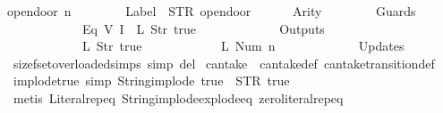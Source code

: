 \begin{isabellebody}
{\isachardoublequoteopen}opendoor\ n\ {\isasymequiv}\ {\isasymlparr}\isanewline
\ \ \ \ \ \ Label\ {\isacharequal}\ STR\ {\isacharprime}{\isacharprime}opendoor{\isacharprime}{\isacharprime}{\isacharcomma}\isanewline
\ \ \ \ \ \ Arity\ {\isacharequal}\ {}{\isacharcomma}\isanewline
\ \ \ \ \ \ Guards\ {\isacharequal}\ {\isacharbrackleft}\isanewline
\ \ \ \ \ \ \ \ \ \ \ \ {\isacharparenleft}Eq\ {\isacharparenleft}V\ {\isacharparenleft}I\ {}{\isacharparenright}{\isacharparenright}\ {\isacharparenleft}L\ {\isacharparenleft}Str\ {\isacharprime}{\isacharprime}true{\isacharprime}{\isacharprime}{\isacharparenright}{\isacharparenright}{\isacharparenright}\isanewline
\ \ \ \ \ \ {\isacharbrackright}{\isacharcomma}\isanewline
\ \ \ \ \ \ Outputs\ {\isacharequal}\ {\isacharbrackleft}\isanewline
\ \ \ \ \ \ \ \ \ \ \ \ {\isacharparenleft}L\ {\isacharparenleft}Str\ {\isacharprime}{\isacharprime}true{\isacharprime}{\isacharprime}{\isacharparenright}{\isacharparenright}{\isacharcomma}\isanewline
\ \ \ \ \ \ \ \ \ \ \ \ {\isacharparenleft}L\ {\isacharparenleft}Num\ n{\isacharparenright}{\isacharparenright}\isanewline
\ \ \ \ \ \ {\isacharbrackright}{\isacharcomma}\isanewline
\ \ \ \ \ \ Updates\ {\isacharequal}\ {\isacharbrackleft}{\isacharbrackright}\isanewline
{\isasymrparr}{\isachardoublequoteclose}\isanewline
\isanewline
{}\isamarkupfalse%
\ size{\isacharunderscore}fset{\isacharunderscore}overloaded{\isacharunderscore}simps\ {\isacharbrackleft}simp\ del{\isacharbrackright}\isanewline
\isanewline
{}\isamarkupfalse%
\ can{\isacharunderscore}take\ {\isacharequal}\ can{\isacharunderscore}take{\isacharunderscore}def\ can{\isacharunderscore}take{\isacharunderscore}transition{\isacharunderscore}def\isanewline
\isanewline
{}\isamarkupfalse%
\ implode{\isacharunderscore}true\ {\isacharbrackleft}simp{\isacharbrackright}{\isacharcolon}\ {\isachardoublequoteopen}String{\isachardot}implode\ {\isacharprime}{\isacharprime}true{\isacharprime}{\isacharprime}\ {\isacharequal}\ STR\ {\isacharprime}{\isacharprime}true{\isacharprime}{\isacharprime}{\isachardoublequoteclose}\isanewline
%
\isadelimproof
\ \ %
\endisadelimproof
%
\isatagproof
{}\isamarkupfalse%
\ {\isacharparenleft}metis\ Literal{\isachardot}rep{\isacharunderscore}eq\ String{\isachardot}implode{\isacharunderscore}explode{\isacharunderscore}eq\ zero{\isacharunderscore}literal{\isachardot}rep{\isacharunderscore}eq{\isacharparenright}%
\endisatagproof
{\isafoldproof}%
%
\isadelimproof
\isanewline
%
\endisadelimproof
\isanewline
{}\isamarkupfalse%

\end{isabellebody}
